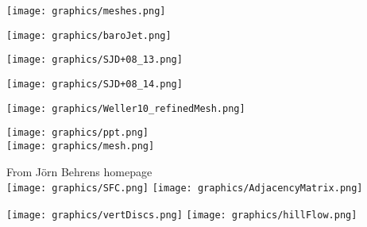 






\begin{minipage}{\linewidth}\centering
\texttt{[image: graphics/meshes.png]}
\end{minipage}

\begin{minipage}{\linewidth}\centering
\texttt{[image: graphics/baroJet.png]} \\
\end{minipage}

\begin{minipage}{\linewidth}\centering
\texttt{[image: graphics/SJD+08\_13.png]}
\end{minipage}

\begin{minipage}{\linewidth}\centering
\texttt{[image: graphics/SJD+08\_14.png]} \\
\end{minipage}

\begin{minipage}{\linewidth}\centering
\texttt{[image: graphics/Weller10\_refinedMesh.png]} \\
\end{minipage}

\begin{minipage}{\linewidth}\centering
\texttt{[image: graphics/ppt.png]} \\
\texttt{[image: graphics/mesh.png]} \\
\end{minipage}

\begin{minipage}{\linewidth}\centering\vspace{1in}
From J\"orn Behrens homepage\\
\texttt{[image: graphics/SFC.png]}
\texttt{[image: graphics/AdjacencyMatrix.png]}
\end{minipage}

\begin{minipage}{\linewidth}\centering
\texttt{[image: graphics/vertDiscs.png]}
\texttt{[image: graphics/hillFlow.png]}
\end{minipage}


